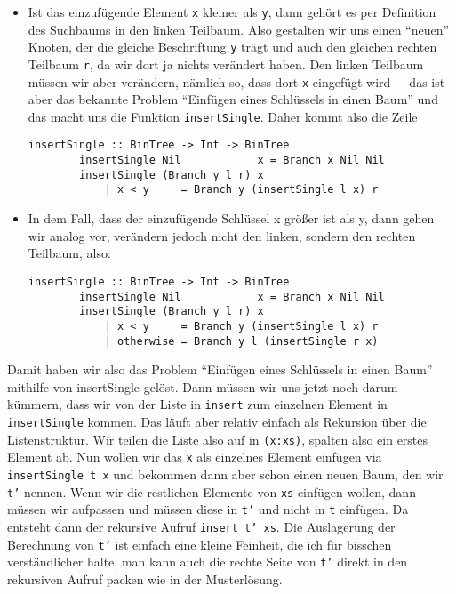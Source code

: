 \documentclass[ngerman, a4paper, 11pt]{article}
\theoremstyle{nonumberplain}
\begin{document}
\begin{itemize}
	\item Ist das einzufügende Element \texttt{x} kleiner als \texttt{y}, dann gehört es per Definition des Suchbaums in den linken Teilbaum. Also gestalten wir uns einen \enquote{neuen} Knoten, der die gleiche Beschriftung \texttt{y} trägt und auch den gleichen rechten Teilbaum \texttt{r}, da wir dort ja nichts verändert haben. Den linken Teilbaum müssen wir aber verändern, nämlich so, dass dort \texttt{x} eingefügt wird -– das ist aber das bekannte Problem \enquote{Einfügen eines Schlüssels in einen Baum} und das macht uns die Funktion \texttt{insertSingle}. Daher kommt also die Zeile 
	\begin{lstlisting}[style=noframe]
		insertSingle :: BinTree -> Int -> BinTree
		insertSingle Nil            x = Branch x Nil Nil
		insertSingle (Branch y l r) x
			| x < y     = Branch y (insertSingle l x) r
	\end{lstlisting}
	\item In dem Fall, dass der einzufügende Schlüssel x größer ist als y, dann gehen wir analog vor, verändern jedoch nicht den linken, sondern den rechten Teilbaum, also:
	\begin{lstlisting}[style=noframe]
		insertSingle :: BinTree -> Int -> BinTree
		insertSingle Nil            x = Branch x Nil Nil
		insertSingle (Branch y l r) x
			| x < y     = Branch y (insertSingle l x) r
			| otherwise = Branch y l (insertSingle r x)
	\end{lstlisting}
\end{itemize}

Damit haben wir also das Problem \enquote{Einfügen eines Schlüssels in einen Baum} mithilfe von insertSingle gelöst. Dann müssen wir uns jetzt noch darum kümmern, dass wir von der Liste in \texttt{insert} zum einzelnen Element in \texttt{insertSingle} kommen. Das läuft aber relativ einfach als Rekursion über die Listenstruktur. Wir teilen die Liste also auf in \texttt{(x:xs)}, spalten also ein erstes Element ab. Nun wollen wir das \texttt{x} als einzelnes Element einfügen via \texttt{insertSingle t x} und bekommen dann aber schon einen neuen Baum, den wir \texttt{t'} nennen. Wenn wir die restlichen Elemente von \texttt{xs} einfügen wollen, dann müssen wir aufpassen und müssen diese in \texttt{t'} und nicht in \texttt{t} einfügen. Da entsteht dann der rekursive Aufruf \texttt{insert t' xs}. Die Auslagerung der Berechnung von \texttt{t'} ist einfach eine kleine Feinheit, die ich für bisschen verständlicher halte, man kann auch die rechte Seite von \texttt{t'} direkt in den rekursiven Aufruf packen wie in der Musterlösung.
\end{document}
